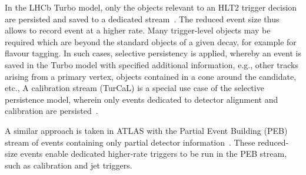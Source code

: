 In the LHCb Turbo model, only the objects relevant to an HLT2 trigger decision are persisted and saved to a dedicated stream~\cite{Aaij:2016rxn}.
The reduced event size thus allows to record event at a higher rate. Many trigger-level objects may be required which are beyond the standard objects of a given decay, for example for flavour tagging. 
In such cases, selective persistency is applied, whereby an event is saved in the Turbo model with specified additional information, e.g., other tracks arising from a primary vertex, objects contained in a cone around the candidate, etc., A calibration stream (TurCaL) is a special use case of the selective persistence model, wherein only events dedicated to detector alignment and calibration are persisted~\cite{Aaij:2019uij}.

A similar approach is taken in ATLAS with the Partial Event Building (PEB) stream of events containing only partial detector information~\cite{ATLASTriggerRun3}. These reduced-size events enable dedicated higher-rate triggers to be run in the PEB stream, such as calibration and jet triggers.
